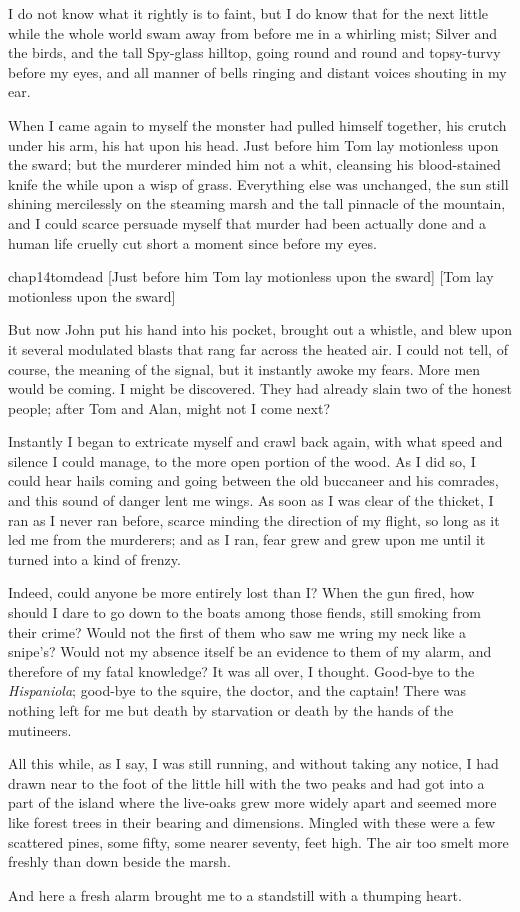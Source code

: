 I do not know what it rightly is to faint, but I do know that for the next little while the whole world swam away from before me in a whirling mist; Silver and the birds, and the tall Spy-glass hilltop, going round and round and topsy-turvy before my eyes, and all manner of bells ringing and distant voices shouting in my ear.

When I came again to myself the monster had pulled himself together, his crutch under his arm, his hat upon his head. Just before him Tom lay motionless upon the sward; but the murderer minded him not a whit, cleansing his blood-stained knife the while upon a wisp of grass. Everything else was unchanged, the sun still shining mercilessly on the steaming marsh and the tall pinnacle of the mountain, and I could scarce persuade myself that murder had been actually done and a human life cruelly cut short a moment since before my eyes.


\begin{colorbigpic}
	[\basicscale]
	{chap14tomdead}
	[Just before him Tom lay motionless upon the sward]
	[Tom lay motionless upon the sward]
\end{colorbigpic}

But now John put his hand into his pocket, brought out a whistle, and blew upon it several modulated blasts that rang far across the heated air. I could not tell, of course, the meaning of the signal, but it instantly awoke my fears. More men would be coming. I might be discovered. They had already slain two of the honest people; after Tom and Alan, might not I come next?

Instantly I began to extricate myself and crawl back again, with what speed and silence I could manage, to the more open portion of the wood. As I did so, I could hear hails coming and going between the old buccaneer and his comrades, and this sound of danger lent me wings. As soon as I was clear of the thicket, I ran as I never ran before, scarce minding the direction of my flight, so long as it led me from the murderers; and as I ran, fear grew and grew upon me until it turned into a kind of frenzy.

Indeed, could anyone be more entirely lost than I\@? When the gun fired, how should I dare to go down to the boats among those fiends, still smoking from their crime? Would not the first of them who saw me wring my neck like a snipe's? Would not my absence itself be an evidence to them of my alarm, and therefore of my fatal knowledge? It was all over, I thought. Good-bye to the \textit{Hispaniola}; good-bye to the squire, the doctor, and the captain! There was nothing left for me but death by starvation or death by the hands of the mutineers.

All this while, as I say, I was still running, and without taking any notice, I had drawn near to the foot of the little hill with the two peaks and had got into a part of the island where the live-oaks grew more widely apart and seemed more like forest trees in their bearing and dimensions. Mingled with these were a few scattered pines, some fifty, some nearer seventy, feet high. The air too smelt more freshly than down beside the marsh.

And here a fresh alarm brought me to a standstill with a thumping heart.